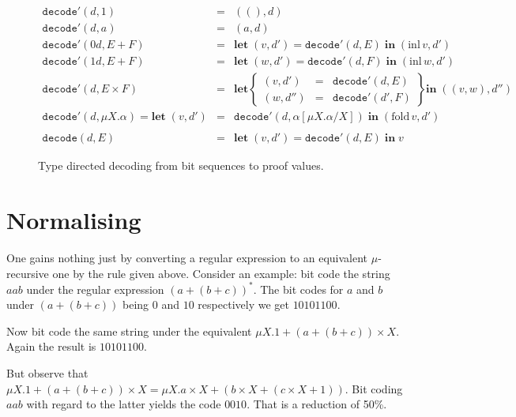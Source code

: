\documentclass[a4paper, oneside]{memoir}
\theoremstyle{definition}
\begin{document}
\begin{figure}
\[
\begin{array}{lcl}
\mathtt{decode'}(d, 1) & = & ((), d) \\
\mathtt{decode'}(d, a) & = & (a, d) \\
\mathtt{decode'}(0d, E + F) & = & \mathbf{let} \; (v,d') = \mathtt{decode'}(d,E) \; \mathbf{in} \; (\mathrm{inl} \, v, d') \\
\mathtt{decode'}(1d, E + F) & = & \mathbf{let} \; (w,d') = \mathtt{decode'}(d,F) \; \mathbf{in} \; (\mathrm{inl} \, w, d') \\
\mathtt{decode'}(d, E \times F) & = &
    \mathbf{let} \left\{ \begin{array}{rcl} (v,d') &=& \mathtt{decode}'(d, E) \\ (w, d'') &=& \mathtt{decode}'(d', F) \end{array} \right\}
    \mathbf{in} \; ((v,w), d'') \\
\mathtt{decode'}(d, \mu X . \alpha) = \mathbf{let} \; (v,d') & = & \mathtt{decode'}(d, \alpha[\mu X . \alpha / X]) \; \mathbf{in} \; (\mathrm{fold} \, v, d') \\
\\
\mathtt{decode}(d, E) & = & \mathbf{let} \; (v, d') = \mathtt{decode'}(d, E) \; \mathbf{in} \; v
\end{array}
\]
\caption{Type directed decoding from bit sequences to proof values.}
\label{fig:decode}
\end{figure}

\section{Normalising}
One gains nothing just by converting a regular expression to an equivalent
$\mu$-recursive one by the rule given above. Consider an example: bit code the
string $aab$ under the regular expression $(a + (b + c))^{\ast}$. The bit codes
for $a$ and $b$ under $(a + (b + c))$ being $0$ and $10$ respectively we get
$10101100$.

Now bit code the same string under the equivalent $\mu X. 1 + (a + (b + c))
\times X$. Again the result is $10101100$.

But observe that $\mu X. 1 + (a + (b + c)) \times X = \mu X. a \times X + (b
\times X + (c \times X + 1))$. Bit coding $aab$ with regard to the latter yields
the code $0010$. That is a reduction of 50\%.
\end{document}
